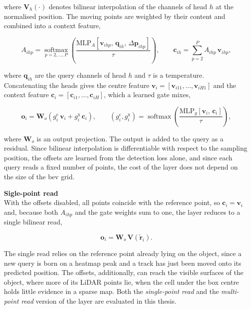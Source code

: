 where $\mathbf{V}_h(\cdot)$ denotes bilinear interpolation of the channels of head $h$ at the normalised
position. The moving points are weighted by their content and combined into a context feature,

\begin{equation}
    A_{ihp} = \operatorname*{softmax}_{p = 2, \dots, P}
              \left( \frac{\mathrm{MLP}_A\!\left[ \mathbf{v}_{ihp},\, \mathbf{q}_{ih},\,
              \Delta\mathbf{p}_{ihp} \right]}{\tau} \right), \qquad
    \mathbf{c}_{ih} = \sum_{p=2}^{P} A_{ihp}\, \mathbf{v}_{ihp},
    \label{eq:design-layer0-context}
\end{equation}

where $\mathbf{q}_{ih}$ are the query channels of head $h$ and $\tau$ is a temperature. Concatenating the
heads gives the centre feature $\mathbf{v}_i = [\mathbf{v}_{i11}, \dots, \mathbf{v}_{iH1}]$ and the context
feature $\mathbf{c}_i = [\mathbf{c}_{i1}, \dots, \mathbf{c}_{iH}]$, which a learned gate mixes,

\begin{equation}
    \mathbf{o}_i = \mathbf{W}_o \left( g_i^{\mathrm{c}}\, \mathbf{v}_i + g_i^{\mathrm{x}}\, \mathbf{c}_i \right),
    \qquad
    \left( g_i^{\mathrm{c}}, g_i^{\mathrm{x}} \right) = \operatorname{softmax}\!\left(
    \frac{\mathrm{MLP}_g\!\left[ \mathbf{v}_i,\, \mathbf{c}_i \right]}{\tau} \right),
    \label{eq:design-layer0}
\end{equation}

where $\mathbf{W}_o$ is an output projection. The output is added to the query as a residual. Since bilinear
interpolation is differentiable with respect to the sampling position, the offsets are learned from the
detection loss alone, and since each query reads a fixed number of points, the cost of the layer does not
depend on the size of the \ac{bev} grid.

\textbf{Sigle-point read} \\
With the offsets disabled, all points coincide with the reference point, so $\mathbf{c}_i = \mathbf{v}_i$
and, because both $A_{ihp}$ and the gate weights sum to one, the layer reduces to a single bilinear read,

\begin{equation}
    \mathbf{o}_i = \mathbf{W}_o\, \mathbf{V}\!\left( \tilde{\mathbf{r}}_i \right).
    \label{eq:design-layer0-single}
\end{equation}

The single read relies on the reference point already lying on the object, since a new query is born on a
heatmap peak and a track has just been moved onto its predicted position. The offsets, additionally, can reach the
visible surfaces of the object, where more of its LiDAR points lie, when the cell under the box centre holds little
evidence in a sparse map. Both the \emph{single-point read} and the \emph{multi-point read} version of the layer are evaluated in this thesis.


